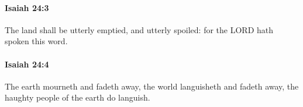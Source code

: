 		\paragraph{Isaiah 24:3} %
			\label{ISAIAH-24-3}

			The land shall be utterly emptied, and utterly spoiled: for the LORD hath spoken this word.


		\paragraph{Isaiah 24:4} %
			\label{ISAIAH-24-4}

			The earth mourneth and fadeth away, the world languisheth and fadeth away, the haughty people of the earth do languish.


